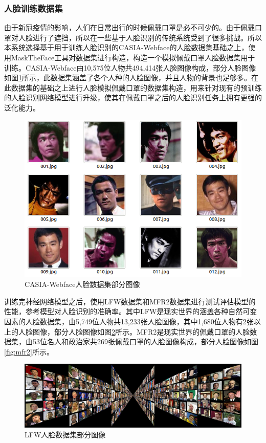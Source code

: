\subsubsection{人脸训练数据集}

由于新冠疫情的影响，人们在日常出行的时候佩戴口罩是必不可少的。由于佩戴口罩对人脸进行了遮挡，所以在一些基于人脸识别的传统系统受到了很多挑战。所以本系统选择基于用于训练人脸识别的CASIA-Webface的人脸数据集基础之上，使用MaskTheFace工具对数据集进行构造，构造一个模拟佩戴口罩人脸数据集用于训练。CASIA-Webface由10,575位人物共494,414张人脸图像构成，部分人脸图像如图\ref{fig:webface}所示，此数据集涵盖了各个人种的人脸图像，并且人物的背景也足够多。在此数据集的基础之上进行人脸模拟佩戴口罩的数据集构造，用来针对现有的预训练的人脸识别网络模型进行升级，使其在佩戴口罩之后的人脸识别任务上拥有更强的泛化能力。

\begin{figure}[H]
    \centering
    \includegraphics[width=.55\textwidth]{figures/4webface.png}
    \caption{CASIA-Webface人脸数据集部分图像}
    \label{fig:webface}
\end{figure}

训练完神经网络模型之后，使用LFW数据集和MFR2数据集进行测试评估模型的性能，参考模型对人脸识别的准确率。其中LFW是现实世界的涵盖各种自然可变因素的人脸数据集，由5,749位人物共13,233张人脸图像，其中1,680位人物有2张以上的人脸图像，部分人脸图像如图\ref{fig:lfw}所示。MFR2是现实世界的佩戴口罩的人脸数据集，由53位名人和政治家共269张佩戴口罩的人脸图像构成，部分人脸图像如图\ref{fig:mfr2}所示。

\begin{figure}[H]
    \centering
    \includegraphics[width=.75\textwidth]{figures/4lfw.jpg}
    \caption{LFW人脸数据集部分图像}
    \label{fig:lfw}
\end{figure}


